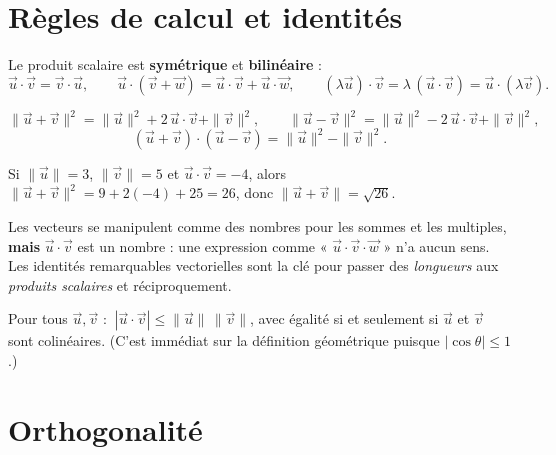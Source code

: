 \section{Règles de calcul et identités}

\begin{propriete}
Le produit scalaire est \textbf{symétrique} et \textbf{bilinéaire} :
\[
\vec u\cdot\vec v=\vec v\cdot\vec u,\qquad
\vec u\cdot(\vec v+\vec w)=\vec u\cdot\vec v+\vec u\cdot\vec w,\qquad
(\lambda\vec u)\cdot\vec v=\lambda\,(\vec u\cdot\vec v)=\vec u\cdot(\lambda\vec v).
\]
\end{propriete}

\begin{propriete}
\[
\|\vec u+\vec v\|^{2}=\|\vec u\|^{2}+2\,\vec u\cdot\vec v+\|\vec v\|^{2},\qquad
\|\vec u-\vec v\|^{2}=\|\vec u\|^{2}-2\,\vec u\cdot\vec v+\|\vec v\|^{2},
\]
\[
(\vec u+\vec v)\cdot(\vec u-\vec v)=\|\vec u\|^{2}-\|\vec v\|^{2}.
\]
\end{propriete}

\begin{exemple}
Si $\|\vec u\|=3$, $\|\vec v\|=5$ et $\vec u\cdot\vec v=-4$, alors
$\|\vec u+\vec v\|^{2}=9+2(-4)+25=26$, donc $\|\vec u+\vec v\|=\sqrt{26}$.
\end{exemple}

\begin{aretenir}
Les vecteurs se manipulent comme des nombres pour les sommes et les multiples,
\textbf{mais} $\vec u\cdot\vec v$ est un nombre : une expression comme « $\vec u\cdot\vec v\cdot\vec w$ »
n'a aucun sens. Les identités remarquables vectorielles sont la clé pour passer des
\emph{longueurs} aux \emph{produits scalaires} et réciproquement.
\end{aretenir}

\begin{propriete}
Pour tous $\vec u,\vec v$ : $\ |\vec u\cdot\vec v|\le\|\vec u\|\,\|\vec v\|$, avec égalité si
et seulement si $\vec u$ et $\vec v$ sont colinéaires. (C'est immédiat sur la définition
géométrique puisque $|\cos\theta|\le1$.)
\end{propriete}

\section{Orthogonalité}

